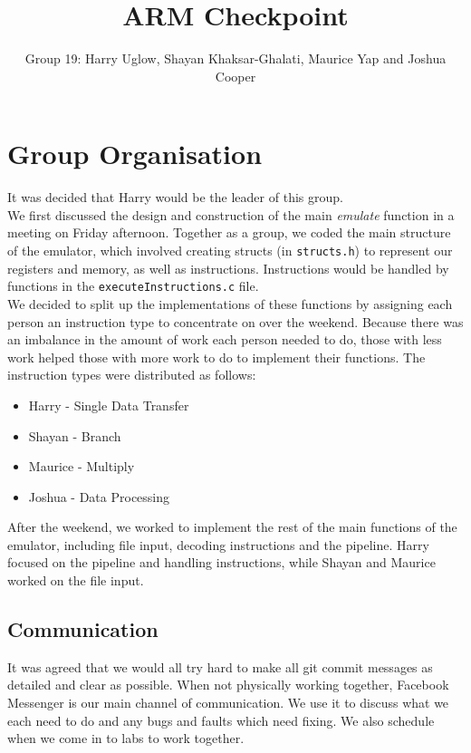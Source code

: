 \documentclass[11pt]{article}
\begin{document}
\title{ARM Checkpoint}
\author{Group 19: Harry Uglow, Shayan Khaksar-Ghalati, Maurice Yap and Joshua Cooper}

\maketitle

\section{Group Organisation}

It was decided that Harry would be the leader of this group.\\

We first discussed the design and construction of the main \textit{emulate} function in a meeting on Friday afternoon. Together as a group, we coded the main structure of the emulator, which involved creating structs (in \texttt{structs.h}) to represent our registers and memory, as well as instructions. Instructions would be handled by functions in the \texttt{executeInstructions.c} file.\\

We decided to split up the implementations of these functions by assigning each person an instruction type to concentrate on over the weekend. Because there was an imbalance in the amount of work each person needed to do, those with less work helped those with more work to do to implement their functions. The instruction types were distributed as follows:\\
\begin{itemize}
\item Harry - Single Data Transfer
\item Shayan - Branch
\item Maurice - Multiply
\item Joshua - Data Processing
\end{itemize}
After the weekend, we worked to implement the rest of the main functions of the emulator, including file input, decoding instructions and the pipeline.  Harry focused on the pipeline and handling instructions, while Shayan and Maurice worked on the file input.

\subsection{Communication}
It was agreed that we would all try hard to make all git commit messages as detailed and clear as possible. When not physically working together, Facebook Messenger is our main channel of communication. We use it to discuss what we each need to do and any bugs and faults which need fixing. We also schedule when we come in to labs to work together.
\end{document}
